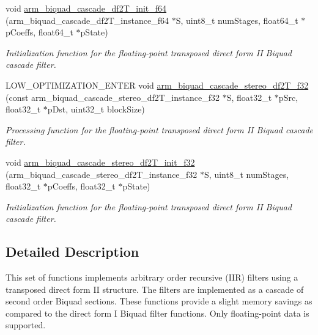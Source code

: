 \begin{DoxyCompactItemize}
void \hyperlink{group__BiquadCascadeDF2T_ga12dc5d8e8892806ad70e79ca2ff9f86e}{arm\+\_\+biquad\+\_\+cascade\+\_\+df2\+T\+\_\+init\+\_\+f64} (arm\+\_\+biquad\+\_\+cascade\+\_\+df2\+T\+\_\+instance\+\_\+f64 $\ast$S, uint8\+\_\+t num\+Stages, float64\+\_\+t $\ast$p\+Coeffs, float64\+\_\+t $\ast$p\+State)
\begin{DoxyCompactList}\small\item\em Initialization function for the floating-\/point transposed direct form II Biquad cascade filter. \end{DoxyCompactList}\item 
L\+O\+W\+\_\+\+O\+P\+T\+I\+M\+I\+Z\+A\+T\+I\+O\+N\+\_\+\+E\+N\+T\+ER void \hyperlink{group__BiquadCascadeDF2T_gac75de449c3e4f733477d81bd0ada5eec}{arm\+\_\+biquad\+\_\+cascade\+\_\+stereo\+\_\+df2\+T\+\_\+f32} (const arm\+\_\+biquad\+\_\+cascade\+\_\+stereo\+\_\+df2\+T\+\_\+instance\+\_\+f32 $\ast$S, float32\+\_\+t $\ast$p\+Src, float32\+\_\+t $\ast$p\+Dst, uint32\+\_\+t block\+Size)
\begin{DoxyCompactList}\small\item\em Processing function for the floating-\/point transposed direct form II Biquad cascade filter. \end{DoxyCompactList}\item 
void \hyperlink{group__BiquadCascadeDF2T_ga405197c89fe4d34003efd23786296425}{arm\+\_\+biquad\+\_\+cascade\+\_\+stereo\+\_\+df2\+T\+\_\+init\+\_\+f32} (arm\+\_\+biquad\+\_\+cascade\+\_\+stereo\+\_\+df2\+T\+\_\+instance\+\_\+f32 $\ast$S, uint8\+\_\+t num\+Stages, float32\+\_\+t $\ast$p\+Coeffs, float32\+\_\+t $\ast$p\+State)
\begin{DoxyCompactList}\small\item\em Initialization function for the floating-\/point transposed direct form II Biquad cascade filter. \end{DoxyCompactList}\end{DoxyCompactItemize}


\subsection{Detailed Description}
This set of functions implements arbitrary order recursive (I\+IR) filters using a transposed direct form II structure. The filters are implemented as a cascade of second order Biquad sections. These functions provide a slight memory savings as compared to the direct form I Biquad filter functions. Only floating-\/point data is supported.

